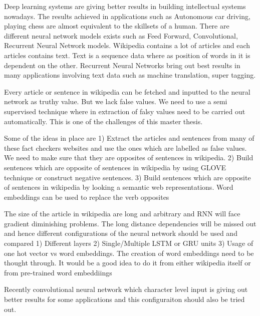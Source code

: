 \documentclass[a4paper, 11pt]{article}
\begin{document}
Deep learning systems are giving better results in building intellectual systems nowadays.\cite{Goldberg2016} The results achieved in applications such as Autonomous car driving, playing chess are almost equivalent to the skillsets of a human. There are different neural network models exists such as Feed Forward, Convolutional, Recurrent Neural Network models. Wikipedia contains a lot of articles and each articles contains text. Text is a sequence data where as position of words in it is dependent on the other. Recurrent Neural Networks bring out best results in many applications involving text data such as machine translation, super tagging.

Every article or sentence in wikipedia can be fetched and inputted to the neural network as truthy value. But we lack false values. We need to use a semi supervised technique where in extraction of falsy values need to be carried out automatically. This is one of the challenges of this master thesis. 

Some of the ideas in place are
1) Extract the articles and sentences from many of these fact checkers websites and use the ones which are labelled as false values. We need to make sure that they are opposites of sentences in wikipedia.
2) Build sentences which are opposite of sentences in wikipedia by using GLOVE technique or construct negative sentences. 
3) Build sentences which are opposite of sentences in wikipedia by looking a semantic web representations. Word embeddings can be used to replace the verb opposites 

The size of the article in wikipedia are long and arbitrary and RNN will face gradient diminishing problems. The long distance dependencies will be missed out and hence different configurations of the neural network should be used and compared 
1) Different layers
2) Single/Multiple LSTM or GRU units
3) Usage of one hot vector vs word embeddings. The creation of word embeddings need to be thought through. It would be a good idea to do it from either wikipedia itself or from pre-trained word embeddiings


Recently convolutional neural network which character level input is giving out better results for some applications and this configuraiton should also be tried out.

\end{document}
